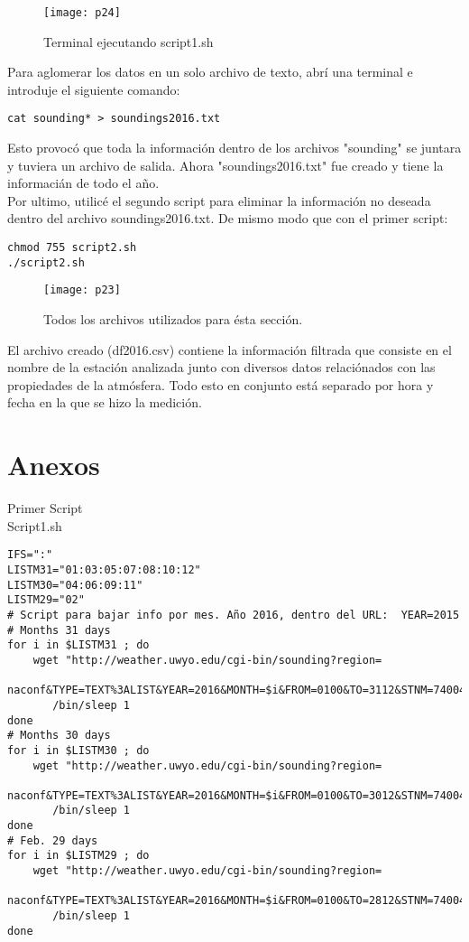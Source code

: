 \documentclass[12pt,a4paper]{article}
\begin{document}
\begin{figure}[h]
\centering
\texttt{[image: p24]}
\caption{Terminal ejecutando script1.sh \label{overflow}}
\end{figure}

Para aglomerar los datos en un solo archivo de texto, abrí una terminal e introduje el siguiente comando: \\

\begin{verbatim}
cat sounding* > soundings2016.txt
\end{verbatim}
 Esto provocó que toda la información dentro de los archivos "sounding" se juntara y tuviera un archivo de salida. Ahora "soundings2016.txt" fue creado y tiene la informacián de todo el año. \\

Por ultimo, utilicé el segundo script para eliminar la información no deseada dentro del archivo soundings2016.txt. De mismo modo que con el primer script: \\
\begin{verbatim}
chmod 755 script2.sh
./script2.sh
\end{verbatim}

\begin{figure}[h]
\centering
\texttt{[image: p23]}
\caption{Todos los archivos utilizados para ésta sección. \label{overflow}}
\end{figure}

El archivo creado (df2016.csv) contiene la información filtrada que consiste en el nombre de la estación analizada junto con diversos datos relaciónados con las propiedades de la atmósfera. Todo esto en conjunto está separado por hora y fecha en la que se hizo la medición. \\

\newpage

\section{Anexos}

\begin{centering}
Primer Script \\
Script1.sh \\
\end{centering}
\begin{verbatim}
IFS=":"
LISTM31="01:03:05:07:08:10:12"
LISTM30="04:06:09:11"
LISTM29="02"
# Script para bajar info por mes. Año 2016, dentro del URL:  YEAR=2015
# Months 31 days
for i in $LISTM31 ; do
    wget "http://weather.uwyo.edu/cgi-bin/sounding?region= 
    naconf&TYPE=TEXT%3ALIST&YEAR=2016&MONTH=$i&FROM=0100&TO=3112&STNM=74004"
       /bin/sleep 1
done
# Months 30 days
for i in $LISTM30 ; do
    wget "http://weather.uwyo.edu/cgi-bin/sounding?region=
    naconf&TYPE=TEXT%3ALIST&YEAR=2016&MONTH=$i&FROM=0100&TO=3012&STNM=74004"
       /bin/sleep 1
done
# Feb. 29 days
for i in $LISTM29 ; do
    wget "http://weather.uwyo.edu/cgi-bin/sounding?region=
    naconf&TYPE=TEXT%3ALIST&YEAR=2016&MONTH=$i&FROM=0100&TO=2812&STNM=74004"
       /bin/sleep 1
done
\end{verbatim}
\end{document}
